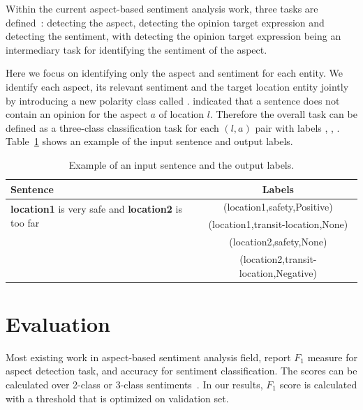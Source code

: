 \documentclass[11pt]{article}
\begin{document}
        Within the current aspect-based sentiment analysis work, three tasks are defined~\cite{brychcin2014uwb}: detecting the aspect, detecting the opinion target expression and detecting the sentiment, with detecting the opinion target expression being an intermediary task for identifying the sentiment of the aspect.
        
        Here we focus on identifying only the aspect and sentiment for each entity. We identify each aspect, its relevant sentiment and the target location entity jointly by introducing a new polarity class called .  indicated that a sentence does not contain an opinion for the aspect $a$ of location $l$. Therefore the overall task can be defined as a three-class classification task for each $(l,a)$ pair with labels , , . Table~\ref{tab:example_task} shows an example of the input sentence and output labels. 
        \begin{table}[ht]
            \begin{center}
            \begin{tabular}{| l | c |}
            \hline
                \textbf{Sentence}                                                                    & \textbf{Labels}    \\
                \hline
                \multirow{2}{*}{\textbf{location1} is very safe and \textbf{location2} is too far}      & (location1,safety,Positive) \\
                                                                                                        & (location1,transit-location,None)\\
                                                                                                        & (location2,safety,None)\\
                                                                                                        & (location2,transit-location,Negative)\\
                \hline
            \end{tabular}
            \end{center}
            \caption{Example of an input sentence and the output labels.}
            \label{tab:example_task}
        \end{table} 
\section{Evaluation}
        Most existing work in aspect-based sentiment analysis field, report $F_1$ measure for aspect detection task, and accuracy for sentiment classification. The scores can be calculated over 2-class or 3-class sentiments~\cite{pontiki2015semeval}. In our results, $F_1$ score is calculated with a threshold that is optimized on validation set. 
        
\end{document}
